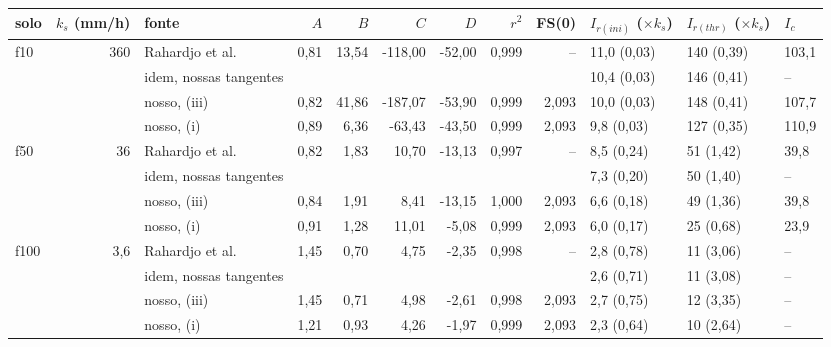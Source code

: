 \begin{tabular}{lrlrrrrrrlll}
\toprule
solo & $k_s$ (mm/h) & fonte & $A$ & $B$ & $C$ & $D$ & $r^2$ & FS(0) & $I_{r(ini)}$ ($\times k_s$) & $I_{r(thr)}$ ($\times k_s$) & $I_c$\\
\midrule
f10 & 360 & Rahardjo et al. & 0{,}81 & 13{,}54 & -118{,}00 & -52{,}00 & 0{,}999 & -- & 11{,}0 (0{,}03) & 140 (0{,}39) & 103{,}1\\
 & & idem, nossas tangentes & & & & & & & 10{,}4 (0{,}03) & 146 (0{,}41) & --\\
 & & nosso, (iii) & 0{,}82 & 41{,}86 & -187{,}07 & -53{,}90 & 0{,}999 & 2{,}093 & 10{,}0 (0{,}03) & 148 (0{,}41) & 107{,}7\\
 & & nosso, (i) & 0{,}89 & 6{,}36 & -63{,}43 & -43{,}50 & 0{,}999 & 2{,}093 & 9{,}8 (0{,}03) & 127 (0{,}35) & 110{,}9\\
\addlinespace
f50 & 36 & Rahardjo et al. & 0{,}82 & 1{,}83 & 10{,}70 & -13{,}13 & 0{,}997 & -- & 8{,}5 (0{,}24) & 51 (1{,}42) & 39{,}8\\
 & & idem, nossas tangentes & & & & & & & 7{,}3 (0{,}20) & 50 (1{,}40) & --\\
 & & nosso, (iii) & 0{,}84 & 1{,}91 & 8{,}41 & -13{,}15 & 1{,}000 & 2{,}093 & 6{,}6 (0{,}18) & 49 (1{,}36) & 39{,}8\\
 & & nosso, (i) & 0{,}91 & 1{,}28 & 11{,}01 & -5{,}08 & 0{,}999 & 2{,}093 & 6{,}0 (0{,}17) & 25 (0{,}68) & 23{,}9\\
\addlinespace
f100 & 3{,}6 & Rahardjo et al. & 1{,}45 & 0{,}70 & 4{,}75 & -2{,}35 & 0{,}998 & -- & 2{,}8 (0{,}78) & 11 (3{,}06) & --\\
 & & idem, nossas tangentes & & & & & & & 2{,}6 (0{,}71) & 11 (3{,}08) & --\\
 & & nosso, (iii) & 1{,}45 & 0{,}71 & 4{,}98 & -2{,}61 & 0{,}998 & 2{,}093 & 2{,}7 (0{,}75) & 12 (3{,}35) & --\\
 & & nosso, (i) & 1{,}21 & 0{,}93 & 4{,}26 & -1{,}97 & 0{,}999 & 2{,}093 & 2{,}3 (0{,}64) & 10 (2{,}64) & --\\
\bottomrule
\end{tabular}
